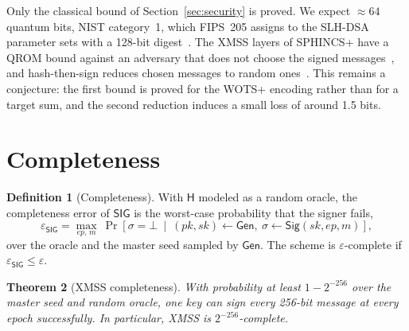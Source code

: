 \documentclass[11pt]{article}
\theoremstyle{definition}
\newtheorem{definition}{Definition}[section]
\theoremstyle{plain}
\newtheorem{theorem}[definition]{Theorem}
\theoremstyle{remark}
\newcommand{\Gen}{\mathsf{Gen}}
\newcommand{\Sig}{\mathsf{Sig}}
\newcommand{\SIG}{\mathsf{SIG}}
\newcommand{\hash}{\mathsf{H}}
\newcommand{\ep}{\mathit{ep}}
\newcommand{\sk}{\mathit{sk}}
\newcommand{\pk}{\mathit{pk}}
\begin{document}
Only the classical bound of Section~\ref{sec:security} is proved. We expect $\approx64$ quantum bits, NIST category~1, which FIPS~205 assigns to the SLH-DSA parameter sets with a 128-bit digest~\cite{FIPS205}. The XMSS layers of SPHINCS+ have a QROM bound against an adversary that does not choose the signed messages~\cite{HK22}, and hash-then-sign reduces chosen messages to random ones~\cite{GHHM21}. This remains a conjecture: the first bound is proved for the WOTS+ encoding rather than for a target sum, and the second reduction induces a small loss of around 1.5 bits.

\section{Completeness}

\begin{definition}[Completeness]
With $\hash$ modeled as a random oracle, the completeness error of $\SIG$ is the worst-case probability that the signer fails,
\[
  \varepsilon_{\SIG}=\max_{\ep,\,m}\ \Pr\!\left[\sigma=\bot\ \middle|\ (\pk,\sk)\gets\Gen,\ \sigma\gets\Sig(\sk,\ep,m)\right],
\]
over the oracle and the master seed sampled by $\Gen$. The scheme is $\varepsilon$-complete if $\varepsilon_{\SIG}\leq\varepsilon$.
\end{definition}

\begin{theorem}[XMSS completeness]
With probability at least $1-2^{-256}$ over the master seed and random oracle, one key can sign every 256-bit message at every epoch successfully. In particular, XMSS is $2^{-256}$-complete.
\end{theorem}
\end{document}
